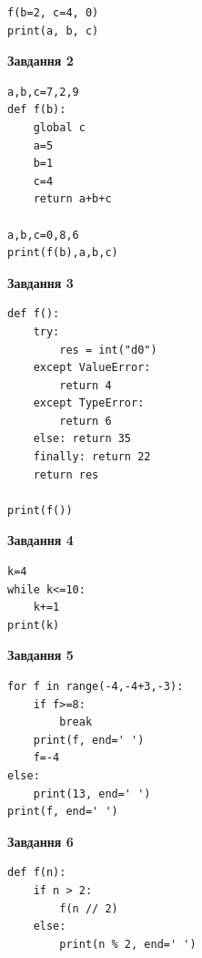 \documentclass[12pt, ukrainian]{article}
\begin{document}
{{{{{{{{{{{{{{{{{{{{\begin{minipage}[t]{7.5cm}
\begin{verbatim}
f(b=2, c=4, 0)
print(a, b, c)
\end{verbatim}



\begin{center}
\textbf{Завдання 2}
\end{center}

\begin{verbatim}
a,b,c=7,2,9
def f(b):
    global c
    a=5
    b=1
    c=4
    return a+b+c

a,b,c=0,8,6
print(f(b),a,b,c)
\end{verbatim}



\begin{center}
\textbf{Завдання 3}
\end{center}

\begin{verbatim}
def f():
    try:
        res = int("d0")
    except ValueError: 
        return 4
    except TypeError: 
        return 6
    else: return 35
    finally: return 22
    return res

print(f())
\end{verbatim}



\begin{center}
\textbf{Завдання 4}
\end{center}

\begin{verbatim}
k=4
while k<=10:
    k+=1
print(k)
\end{verbatim}

\end{minipage}
\vline \hspace{6mm}
\begin{minipage}[t]{10.5cm}

\begin{center}
\textbf{Завдання 5}
\end{center}

\begin{verbatim}
for f in range(-4,-4+3,-3):
    if f>=8:
        break
    print(f, end=' ')
    f=-4
else:
    print(13, end=' ')
print(f, end=' ')
\end{verbatim}



\begin{center}
\textbf{Завдання 6}
\end{center}

\begin{verbatim}
def f(n):
    if n > 2:
        f(n // 2)
    else:
        print(n % 2, end=' ')


\end{verbatim}
\end{minipage}}}}}}}}}}}}}}}}}}}}}
\end{document}
